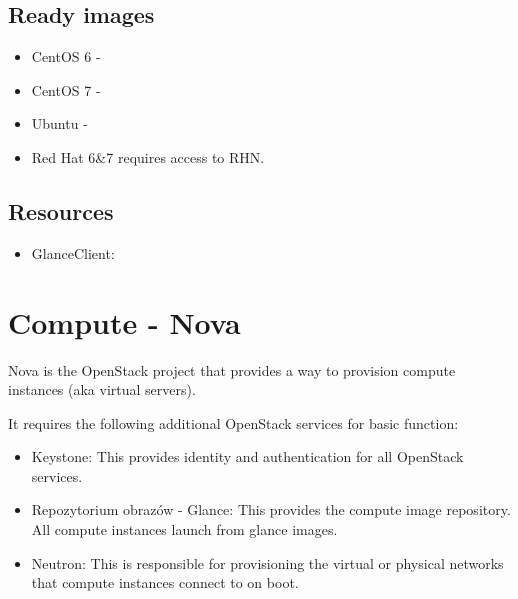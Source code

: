 \documentclass[letterpaper,10pt,english]{sphinxmanual}
\begin{document}


\subsection{Ready images}
\label{\detokenize{basics/README:ready-images}}\begin{itemize}
\item {} 
CentOS 6 - 

\item {} 
CentOS 7 - 

\item {} 
Ubuntu - 

\item {} 
Red Hat 6\&7 \textendash{} requires access to RHN.

\end{itemize}


\subsection{Resources}
\label{\detokenize{basics/README:id1}}\begin{itemize}
\item {} 
GlanceClient: 

\end{itemize}


\section{Compute - Nova}
\label{\detokenize{basics/README:compute-nova}}
Nova is the OpenStack project that provides a way to provision compute instances (aka virtual servers).

It requires the following additional OpenStack services for basic function:
\begin{itemize}
\item {} 
Keystone: This provides identity and authentication for all OpenStack services.

\item {} 
Repozytorium obrazów - Glance: This provides the compute image repository. All compute instances launch from glance images.

\item {} 
Neutron: This is responsible for provisioning the virtual or physical networks that compute instances connect to on boot.

\end{itemize}
\end{document}
